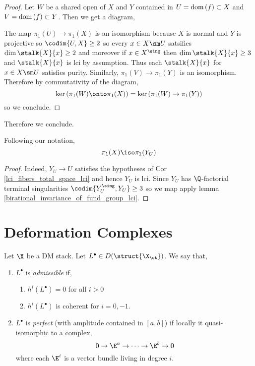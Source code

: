 \documentclass[12pt]{article}
\begin{document}
\begin{proof}
Let $W$ be a shared open of $X$ and $Y$ contained in $U = \mathrm{dom} \left( f \right) \subset X$ and $V = \mathrm{dom} \left( f \right) \subset Y$. Then we get a diagram,
\begin{center}
\end{center}
The map $\pi_1(U) \to \pi_1(X)$ is an isomorphism because $X$ is normal and $Y$ is projective so $\codim{U, X} \ge 2$ so every $x \in X \sm U$ satsifies $\dim{\stalk{X}{x}} \ge 2$ and moreover if $x \in X^{\sing}$ then $\dim{\stalk{X}{x}} \ge 3$ and $\stalk{X}{x}$ is lci by assumption. Thus each $\stalk{X}{x}$ for $x \in X \sm U$ satisfies purity. Similarly, $\pi_1(V) \to \pi_1(Y)$ is an isomorphism. Therefore by commutativity of the diagram,
\[ \ker{(\pi_1(W) \onto \pi_1(X))} = \ker{(\pi_1(W) \to \pi_1(Y))} \]
so we conclude.
\end{proof}

Therefore we conclude.

\begin{prop}
Following our notation, 
\[ \pi_1(X) \iso \pi_1(Y_U) \]
\end{prop}

\begin{proof}
Indeed, $Y_U \to U$ satisfies the hypotheses of Cor \ref{lci_fibers_total_space_lci} and hence $Y_U$ is lci. Since $Y_U$ has $\Q$-factorial terminal singularities $\codim{Y_U^{\sing}, Y_U} \ge 3$ so we map apply lemma \ref{birational_invariance_of_fund_group_lci}. 
\end{proof}

\section{Deformation Complexes}

\newcommand{\LL}{\mathbb{L}}

\begin{defn}
Let $\X$ be a DM stack. Let $L^\bullet \in D(\struct{\X_{\et}})$. We say that, 
\begin{enumerate}
\item $L^\bullet$ is \textit{admissible} if,
\begin{enumerate}
\item $h^i(L^\bullet) = 0$ for all $i > 0$
\item $h^i(L^\bullet)$ is coherent for $i = 0,-1$.
\end{enumerate}
\item $L^\bullet$ is \textit{perfect} (with amplitude contained in $[a,b]$) if locally it quasi-isomorphic to a complex,
\[ 0 \to \E^a \to \cdots \to \E^b \to 0 \]
where each $\E^i$ is a vector bundle living in degree $i$. 
\end{enumerate}
\end{defn}
\end{document}
